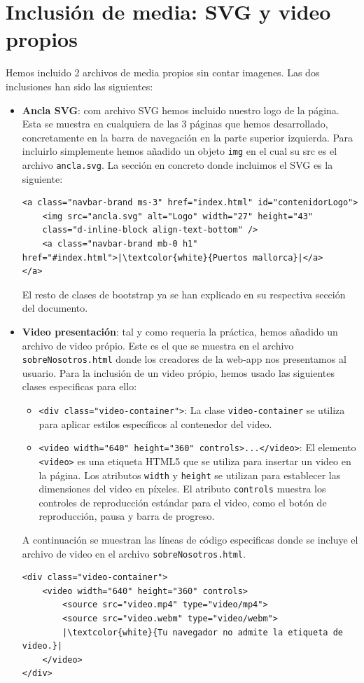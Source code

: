\documentclass{article}
\begin{document}
\section{Inclusión de media: SVG y video propios}
Hemos incluido 2 archivos de media propios sin contar imagenes. Las dos inclusiones han sido las siguientes:
\begin{itemize}
    \item \textbf{Ancla SVG}: com archivo SVG hemos incluido nuestro logo de la página. Esta se muestra en cualquiera de las 3 páginas que hemos desarrollado, concretamente en la barra de navegación en la parte superior izquierda. Para incluirlo simplemente hemos añadido un objeto \texttt{img} en el cual su src es el archivo \texttt{ancla.svg}. La sección en concreto donde incluimos el SVG es la siguiente:
    \begin{verbatim}
<a class="navbar-brand ms-3" href="index.html" id="contenidorLogo">
    <img src="ancla.svg" alt="Logo" width="27" height="43" 
    class="d-inline-block align-text-bottom" />
    <a class="navbar-brand mb-0 h1" href="#index.html">|\textcolor{white}{Puertos mallorca}|</a>
</a>
    \end{verbatim}
El resto de clases de bootstrap ya se han explicado en su respectiva sección del documento.
    \item \textbf{Video presentación}: tal y como requeria la práctica, hemos añadido un archivo de video própio. Este es el que se muestra en el archivo \texttt{sobreNosotros.html} donde los creadores de la web-app nos presentamos al usuario. Para la inclusión de un video própio, hemos usado las siguientes clases especificas para ello:
    \begin{itemize}
        \item \texttt{<div class="video-container">}: La clase \texttt{video-container} se utiliza para aplicar estilos específicos al contenedor del video.
            
        \item \texttt{<video width="640" height="360" controls>...</video>}: El elemento \texttt{<video>} es una etiqueta HTML5 que se utiliza para insertar un video en la página. Los atributos \texttt{width} y \texttt{height} se utilizan para establecer las dimensiones del video en píxeles. El atributo \texttt{controls} muestra los controles de reproducción estándar para el video, como el botón de reproducción, pausa y barra de progreso.
    \end{itemize}
    A continuación se muestran las líneas de código especificas donde se incluye el archivo de video en el archivo \texttt{sobreNosotros.html}.
    \begin{verbatim}
<div class="video-container">
    <video width="640" height="360" controls>
        <source src="video.mp4" type="video/mp4">
        <source src="video.webm" type="video/webm">
        |\textcolor{white}{Tu navegador no admite la etiqueta de video.}|
    </video>
</div>
    \end{verbatim}
\end{itemize}
\end{document}
